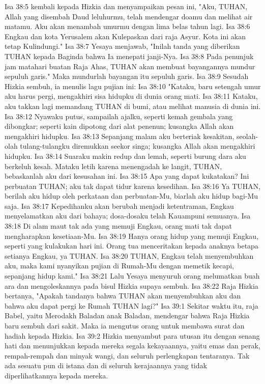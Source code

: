 Isa 38:5  kembali kepada Hizkia dan menyampaikan pesan ini, "Aku, TUHAN, Allah yang disembah Daud leluhurmu, telah mendengar doamu dan melihat air matamu. Aku akan menambah umurmu dengan lima belas tahun lagi.
Isa 38:6  Engkau dan kota Yerusalem akan Kulepaskan dari raja Asyur. Kota ini akan tetap Kulindungi."
Isa 38:7  Yesaya menjawab, "Inilah tanda yang diberikan TUHAN kepada Baginda bahwa Ia menepati janji-Nya.
Isa 38:8  Pada penunjuk jam matahari buatan Raja Ahas, TUHAN akan membuat bayangannya mundur sepuluh garis." Maka mundurlah bayangan itu sepuluh garis.
Isa 38:9  Sesudah Hizkia sembuh, ia menulis lagu pujian ini:
Isa 38:10  "Kataku, baru setengah umur aku harus pergi, mengakhiri sisa hidupku di dunia orang mati.
Isa 38:11  Kataku, aku takkan lagi memandang TUHAN di bumi, atau melihat manusia di dunia ini.
Isa 38:12  Nyawaku putus, sampailah ajalku, seperti kemah gembala yang dibongkar; seperti kain dipotong dari alat penenun; kusangka Allah akan mengakhiri hidupku.
Isa 38:13  Sepanjang malam aku berteriak kesakitan, seolah-olah tulang-tulangku diremukkan seekor singa; kusangka Allah akan mengakhiri hidupku.
Isa 38:14  Suaraku makin redup dan lemah, seperti burung dara aku berkeluh kesah. Mataku letih karena menengadah ke langit, TUHAN, bebaskanlah aku dari kesusahan ini.
Isa 38:15  Apa yang dapat kukatakan? Ini perbuatan TUHAN; aku tak dapat tidur karena kesedihan.
Isa 38:16  Ya TUHAN, berilah aku hidup oleh perkataan dan perbuatan-Mu, biarlah aku hidup bagi-Mu saja.
Isa 38:17  Kepedihanku akan berubah menjadi ketentraman, Engkau menyelamatkan aku dari bahaya; dosa-dosaku telah Kauampuni semuanya.
Isa 38:18  Di alam maut tak ada yang memuji Engkau, orang mati tak dapat mengharapkan kesetiaan-Mu.
Isa 38:19  Hanya orang hidup yang memuji Engkau, seperti yang kulakukan hari ini. Orang tua menceritakan kepada anaknya betapa setianya Engkau, ya TUHAN.
Isa 38:20  TUHAN, Engkau telah menyembuhkan aku, maka kami nyanyikan pujian di Rumah-Mu dengan memetik kecapi, sepanjang hidup kami."
Isa 38:21  Lalu Yesaya menyuruh orang melumatkan buah ara dan mengoleskannya pada bisul Hizkia supaya sembuh.
Isa 38:22  Raja Hizkia bertanya, "Apakah tandanya bahwa TUHAN akan menyembuhkan aku dan bahwa aku dapat pergi ke Rumah TUHAN lagi?"
Isa 39:1  Sekitar waktu itu, raja Babel, yaitu Merodakh Baladan anak Baladan, mendengar bahwa Raja Hizkia baru sembuh dari sakit. Maka ia mengutus orang untuk membawa surat dan hadiah kepada Hizkia.
Isa 39:2  Hizkia menyambut para utusan itu dengan senang hati dan menunjukkan kepada mereka segala kekayaannya, yaitu emas dan perak, rempah-rempah dan minyak wangi, dan seluruh perlengkapan tentaranya. Tak ada sesuatu pun di istana dan di seluruh kerajaannya yang tidak diperlihatkannya kepada mereka.
